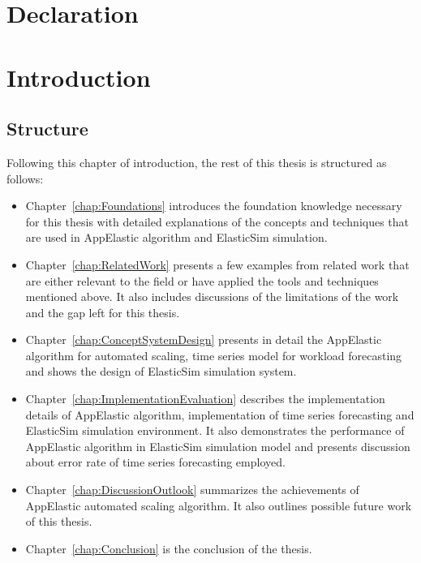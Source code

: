\documentclass[12pt]{report}
\theoremstyle{definition}
\begin{document}
\chapter*{Declaration}

\thispagestyle{empty}

\chapter*{}
\tableofcontents
\thispagestyle{empty}

\pagestyle{fancy}
\fancyhead[LE,RO]{\itshape \nouppercase \rightmark}
\fancyfoot[CE,CO]{\thepage}
\setcounter{page}{0}
\chapter{Introduction}
\label{chap:Introduction}

\section{Structure}
\label{sec:Structure}
Following this chapter of introduction, the rest of this thesis is structured as follows:
\begin{itemize}
  \item Chapter~\ref{chap:Foundations} introduces the foundation knowledge necessary for this thesis with detailed explanations of the concepts and techniques that are used in AppElastic algorithm and ElasticSim simulation.
  \item Chapter~\ref{chap:RelatedWork} presents a few examples from related work that are either relevant to the field or have applied the tools and techniques mentioned above. It also includes discussions of the limitations of the work and the gap left for this thesis.
  \item Chapter~\ref{chap:ConceptSystemDesign} presents in detail the AppElastic algorithm for automated scaling, time series model for workload forecasting and shows the design of ElasticSim simulation system.
 \item Chapter~\ref{chap:ImplementationEvaluation} describes the implementation details of AppElastic algorithm, implementation of time series forecasting and  ElasticSim simulation environment. It also demonstrates the performance of AppElastic algorithm in ElasticSim simulation model and presents discussion about error rate of time series forecasting employed.
  \item Chapter~\ref{chap:DiscussionOutlook} summarizes the achievements of AppElastic automated scaling algorithm. It also outlines possible future work of this thesis.
  \item Chapter~\ref{chap:Conclusion} is the conclusion of the thesis.
\end{itemize}
\end{document}
